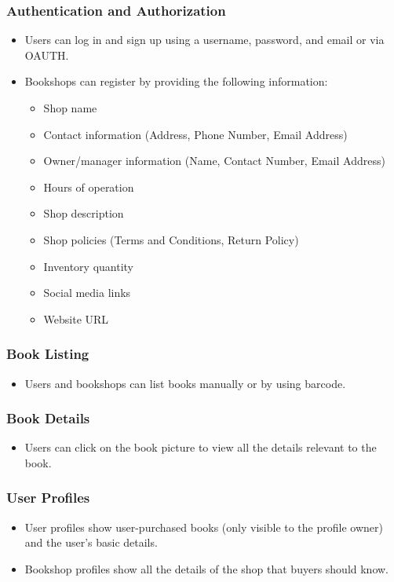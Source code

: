 \subsubsection*{Authentication and Authorization}
\begin{itemize}
  \item Users can log in and sign up using a username, password, and email or via OAUTH.
  \item Bookshops can register by providing the following information:
  \begin{itemize}
    \item Shop name
    \item Contact information (Address, Phone Number, Email Address)
    \item Owner/manager information (Name, Contact Number, Email Address)
    \item Hours of operation
    \item Shop description
    \item Shop policies (Terms and Conditions, Return Policy)
    \item Inventory quantity
    \item Social media links
    \item Website URL
  \end{itemize}
\end{itemize}

\subsubsection{Book Listing}
\begin{itemize}
  \item Users and bookshops can list books manually or by using barcode.
\end{itemize}

\subsubsection{Book Details}
\begin{itemize}
  \item Users can click on the book picture to view all the details relevant to the book.
\end{itemize}

\subsubsection{User Profiles}
\begin{itemize}
  \item User profiles show user-purchased books (only visible to the profile owner) and the user's basic details.
  \item Bookshop profiles show all the details of the shop that buyers should know.
\end{itemize}

